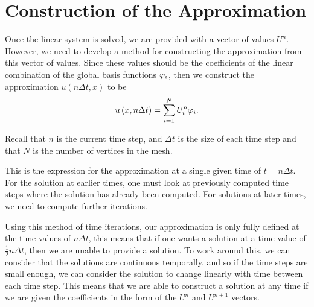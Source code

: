 \documentclass[../fem.tex]{subfile}
\begin{document}
\section{Construction of the Approximation}%
\label{sec:construction_of_the_approximation}

Once the linear system is solved, we are provided with a vector of values $U^n$.
However, we need to develop a method for constructing the approximation from
this vector of values. Since these values should be the coefficients of the
linear combination of the global basis functions $\varphi_i$, then we construct the
approximation $u(n\Delta t, x)$ to be
\begin{align*}
  u\left(x, n\Delta t\right)=\sum_{i=1}^NU^n_i\varphi_i.
\end{align*}

Recall that $n$ is the current time step, and $\Delta t$ is the size of each
time step and that $N$ is the number of vertices in the mesh.

This is the expression for the approximation at a single given time of
$t=n\Delta t$. For the solution at earlier times, one must look at previously
computed time steps where the solution has already been computed. For solutions
at later times, we need to compute further iterations.

Using this method of time iterations, our approximation is only fully defined
at the time values of $n\Delta t$, this means that if one wants a solution at a
time value of $\frac{1}{2}n\Delta t$, then we are unable to provide a solution.
To work around this, we can consider that the solutions are continuous
temporally, and so if the time steps are small enough, we can consider the
solution to change linearly with time between each time step. This means that
we are able to construct a solution at any time if we are given the
coefficients in the form of the $U^n$ and $U^{n+1}$ vectors.
\end{document}
